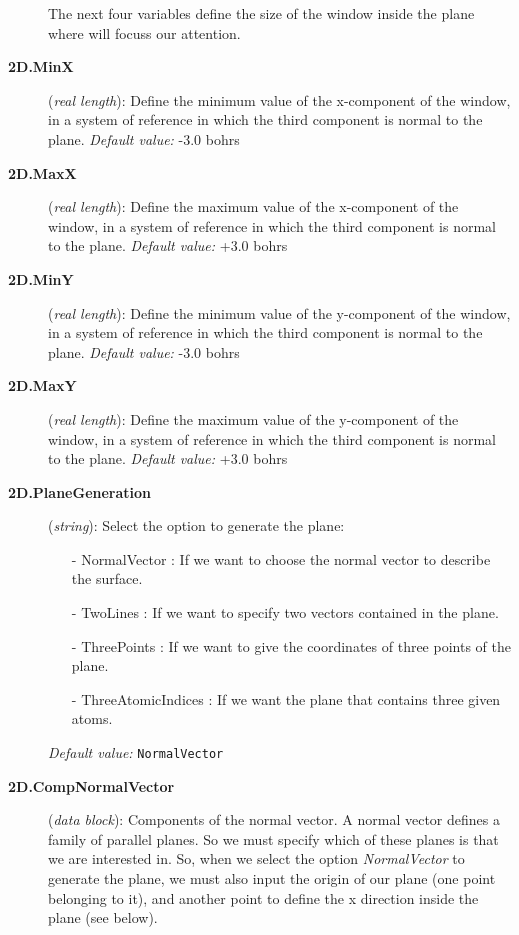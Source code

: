 \begin{description}
\noindent 
 The next four variables define the size of the window inside the plane where
 will focuss our attention.

\item[{\bf 2D.MinX}] ({\it real length}):
 Define the minimum value of the x-component of the window, in a system 
 of reference in which the third component is normal to the plane.
{\it Default value:} -3.0 bohrs

\item[{\bf 2D.MaxX}] ({\it real length}):
 Define the maximum value of the x-component of the window, in a system 
 of reference in which the third component is normal to the plane.
{\it Default value:} +3.0 bohrs

\item[{\bf 2D.MinY}] ({\it real length}):
 Define the minimum value of the y-component of the window, in a system 
 of reference in which the third component is normal to the plane.
{\it Default value:} -3.0 bohrs

\item[{\bf 2D.MaxY}] ({\it real length}):
 Define the maximum value of the y-component of the window, in a system 
 of reference in which the third component is normal to the plane.
{\it Default value:} +3.0 bohrs

\item[{\bf 2D.PlaneGeneration}] ({\it string}): 
 Select the option to generate the plane:

\begin{itemize}
\item[-] NormalVector : If we want to choose the normal vector to describe the
                        surface.
\item[-] TwoLines       : If we want to specify two vectors contained in the 
                        plane.
\item[-] ThreePoints  : If we want to give the coordinates of three points 
                        of the plane.
\item[-] ThreeAtomicIndices : If we want the plane that contains three 
                        given atoms.
\end{itemize}
\noindent
{\it Default value:} {\tt NormalVector}


\item[{\bf 2D.CompNormalVector}] ({\it data block}): 
Components of the normal vector. A normal vector defines a family of parallel
planes. So we must specify which of these planes is that we are interested in.
So, when we select the option {\it NormalVector} to generate the plane, we must 
also input the origin of our plane (one point belonging to it), and another
point to define the x direction inside the plane (see below).


\end{description}
